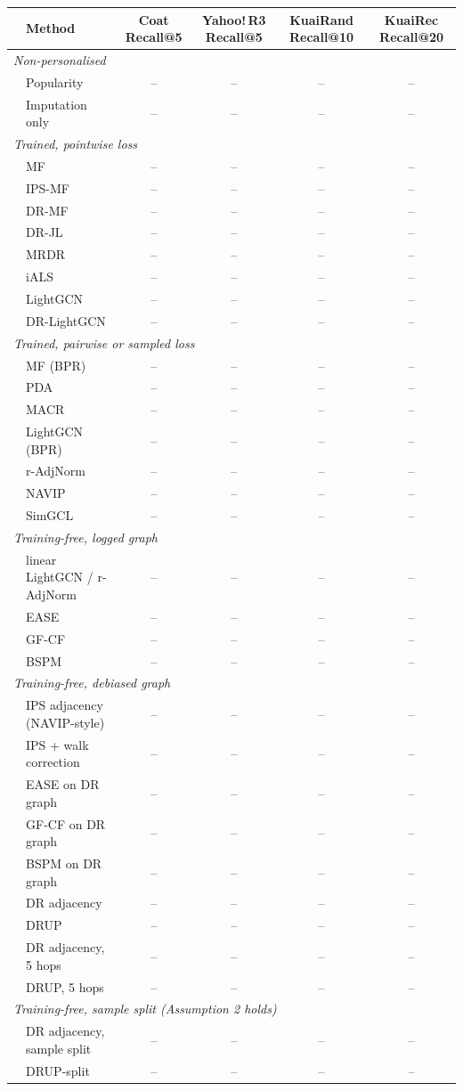 \begin{tabular}{llcccc}
\toprule
 & Method & Coat Recall@5 & Yahoo!\,R3 Recall@5 & KuaiRand Recall@10 & KuaiRec Recall@20\\
\midrule
\multicolumn{6}{l}{\emph{Non-personalised}}\\
 & Popularity & -- & -- & -- & --\\
 & Imputation only & -- & -- & -- & --\\
\multicolumn{6}{l}{\emph{Trained, pointwise loss}}\\
 & MF & -- & -- & -- & --\\
 & IPS-MF & -- & -- & -- & --\\
 & DR-MF & -- & -- & -- & --\\
 & DR-JL & -- & -- & -- & --\\
 & MRDR & -- & -- & -- & --\\
 & iALS & -- & -- & -- & --\\
 & LightGCN & -- & -- & -- & --\\
 & DR-LightGCN & -- & -- & -- & --\\
\multicolumn{6}{l}{\emph{Trained, pairwise or sampled loss}}\\
 & MF (BPR) & -- & -- & -- & --\\
 & PDA & -- & -- & -- & --\\
 & MACR & -- & -- & -- & --\\
 & LightGCN (BPR) & -- & -- & -- & --\\
 & r-AdjNorm & -- & -- & -- & --\\
 & NAVIP & -- & -- & -- & --\\
 & SimGCL & -- & -- & -- & --\\
\multicolumn{6}{l}{\emph{Training-free, logged graph}}\\
 & linear LightGCN / r-AdjNorm & -- & -- & -- & --\\
 & EASE & -- & -- & -- & --\\
 & GF-CF & -- & -- & -- & --\\
 & BSPM & -- & -- & -- & --\\
\multicolumn{6}{l}{\emph{Training-free, debiased graph}}\\
 & IPS adjacency (NAVIP-style) & -- & -- & -- & --\\
 & IPS + walk correction & -- & -- & -- & --\\
 & EASE on DR graph & -- & -- & -- & --\\
 & GF-CF on DR graph & -- & -- & -- & --\\
 & BSPM on DR graph & -- & -- & -- & --\\
 & DR adjacency & -- & -- & -- & --\\
 & DRUP & -- & -- & -- & --\\
 & DR adjacency, 5 hops & -- & -- & -- & --\\
 & DRUP, 5 hops & -- & -- & -- & --\\
\multicolumn{6}{l}{\emph{Training-free, sample split (Assumption 2 holds)}}\\
 & DR adjacency, sample split & -- & -- & -- & --\\
 & DRUP-split & -- & -- & -- & --\\
\bottomrule
\end{tabular}
